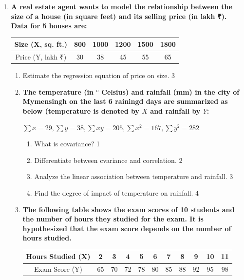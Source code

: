 \documentclass[a4paper,oneside]{book}
\begin{document}
 \begin{enumerate}
 
 \item
  \textbf{A real estate agent wants to model the relationship between the size of a house (in square feet) and its selling price (in lakh ₹). Data for 5 houses are:}

\begin{table}[h!]
\centering
\begin{tabular}{c|c|c|c|c|c}
Size (X, sq. ft.) & 800 & 1000 & 1200 & 1500 & 1800 \\ \hline
Price (Y, lakh ₹) & 30 & 38 & 45 & 55 & 65 \\
\end{tabular}
\end{table}

\begin{enumerate}
    \item
    Estimate the regression equation of price on size. \hfill 3
    
 
  \item
	  \textbf{The temperature (in $^o$ Celsius) and rainfall (mm) in the city of Mymensingh on the last 6 rainingd days are summarized as below (temperature is denoted by $X$ and rainfall by $Y$: } 
	  
	  \begin{center}
	  $\sum x = 29, \sum y = 38, \sum xy = 205, \sum x^2 = 167, \sum y^2 = 282$
  \end{center}
  \begin{enumerate}
    \item
	What is covariance? \hfill 1
    \item
	Differentiate between cvariance and correlation. \hfill 2
    \item  
	Analyze the linear association between temperature and rainfall. \hfill 3
    \item
	Find the degree of impact of temperature on rainfall. \hfill 4
  \end{enumerate}
 
   \item
	  \textbf{The following table shows the exam scores of 10 students and the number of hours they studied for the exam. It is hypothesized that the exam score depends on the number of hours studied.} 
	  
\begin{table}[h!]
\centering
\begin{tabular}{c|c|c|c|c|c|c|c|c|c|c}
Hours Studied (X) & 2 & 3 & 4 & 5 & 6 & 7 & 8 & 9 & 10 & 11 \\ \hline
Exam Score (Y) & 65 & 70 & 72 & 78 & 80 & 85 & 88 & 92 & 95 & 98 \\
\end{tabular}
\end{table}


\end{enumerate}
\end{enumerate}
\end{document}
